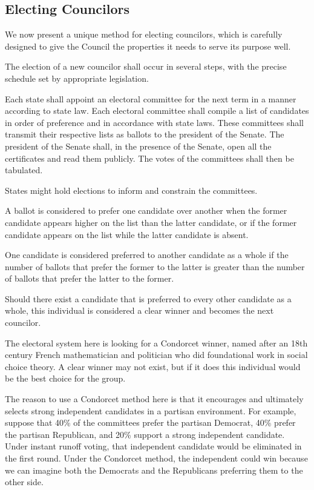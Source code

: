 \documentclass{article}
\begin{document}
\subsection{Electing Councilors}

We now present a unique method for electing councilors, which is carefully designed to give the Council the properties it needs to serve its purpose well.

\begin{quoting}
The election of a new councilor shall occur in several steps, with the precise schedule set by appropriate legislation.

Each state shall appoint an electoral committee for the next term in a manner according to state law. Each electoral committee shall compile a list of candidates in order of preference and in accordance with state laws. These committees shall transmit their respective lists as ballots to the president of the Senate.  The president of the Senate shall, in the presence of the Senate, open all the certificates and read them publicly. The votes of the committees shall then be tabulated.
\end{quoting}

States might hold elections to inform and constrain the committees.

\begin{quoting}
A ballot is considered to prefer one candidate over another when the former candidate appears higher on the list than the latter candidate, or if the former candidate appears on the list while the latter candidate is absent.

One candidate is considered preferred to another candidate as a whole if the number of ballots that prefer the former to the latter is greater than the number of ballots that prefer the latter to the former.

Should there exist a candidate that is preferred to every other candidate as a whole, this individual is considered a clear winner and becomes the next councilor.
\end{quoting}

The electoral system here is looking for a Condorcet winner, named after an 18th century French mathematician and politician who did foundational work in social choice theory. A clear  winner may not exist, but if it does this individual would be the best choice for the group.

The reason to use a Condorcet method here is that it encourages and ultimately selects strong independent candidates in a partisan environment. For example, suppose that 40\% of the committees prefer the partisan Democrat, 40\% prefer the partisan Republican, and 20\% support a strong independent candidate. Under instant runoff voting, that independent candidate would be eliminated in the first round. Under the Condorcet method, the independent could win because we can imagine both the Democrats and the Republicans preferring them to the other side.
\end{document}
